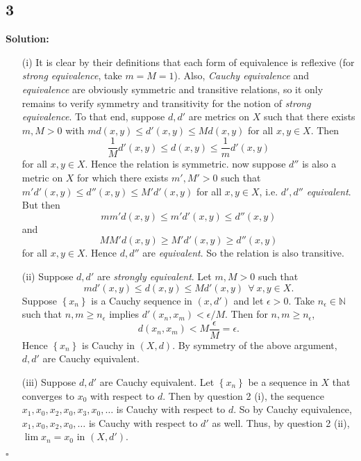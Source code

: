 \documentclass[12pt]{article}
\newcounter{ProofCounter}
\newenvironment{Solution}{\stepcounter{ProofCounter}\textbf{Solution:}}{\hfill$\square$}
\begin{document}
\subsection*{3}
\begin{Solution}
  \begin{enumerate}
    \item[(i)] It is clear by their definitions that each form of equivalence is reflexive (for \emph{strong equivalence}, take $m = M = 1$).
      Also, \emph{Cauchy equivalence} and \emph{equivalence} are obviously symmetric and transitive relations, so it only remains to verify symmetry
      and transitivity for the notion of \emph{strong equivalence}. To that end, suppose $d, d'$ are metrics on $X$ such that there exists $m, M > 0$
      with $md(x,y) \leq d'(x,y) \leq Md(x,y)$ for all $x,y \in X$. Then 
      \[
        \frac{1}{M} d'(x,y) \leq d(x,y) \leq \frac{1}{m}d'(x,y)
      \]
      for all $x,y \in X$. Hence the relation is symmetric. now suppose $d''$ is also a metric on $X$ for which there exists $m', M' > 0$ such that 
      $m'd'(x,y) \leq d''(x,y) \leq M'd'(x,y)$ for all $x,y \in X$, i.e. $d', d''$ \emph{equivalent}. But then 
      \[
        mm' d(x,y) \leq m'd'(x,y) \leq d''(x,y) 
      \]
      and 
      \[
        MM'd(x,y) \geq M'd'(x,y) \geq d''(x,y)
      \]
      for all $x,y \in X$. Hence $d,d''$ are \emph{equivalent}. So the relation is also transitive.

    \item[(ii)] Suppose $d, d'$ are \emph{strongly equivalent}. Let $m, M > 0$ such that 
      \[
        md'(x,y) \leq d(x,y) \leq Md'(x,y) \ \ \forall \ x,y \in X.
      \]
      Suppose $\left\{ x_n \right\}$ is a Cauchy sequence in $(x,d')$ and let $\epsilon > 0$. Take $n_{\epsilon} \in \mathbb{N}$ such that $n,m \geq
      n_{\epsilon}$ implies $d'(x_n,x_m) < \epsilon / M$. Then for $n,m \geq n_{\epsilon}$,
      \[
        d(x_n,x_m) < M \frac{\epsilon}{M} = \epsilon.
      \]
      Hence $\left\{ x_n \right\}$ is Cauchy in $(X,d)$. By symmetry of the above argument, $d, d'$ are Cauchy equivalent.

    \item[(iii)] Suppose $d,d'$ are Cauchy equivalent. Let $\left\{ x_n \right\}$ be a sequence in $X$ that converges to $x_0$ with respect to $d$.
      Then by question 2 (i), the sequence $x_1, x_0, x_2, x_0, x_3, x_0, \dots$ is Cauchy with respect to $d$.
      So by Cauchy equivalence, $x_1, x_0, x_2, x_0, \dots$ is Cauchy with respect to $d'$ as
      well. Thus, by question 2 (ii), $\lim x_n = x_0$ in $(X, d')$.


\end{enumerate}
\end{Solution}
\end{document}
